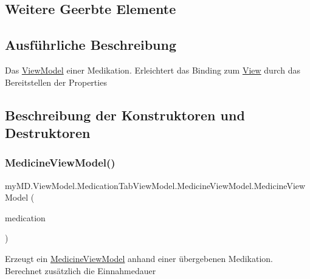 \subsection*{Weitere Geerbte Elemente}


\subsection{Ausführliche Beschreibung}
Das \mbox{\hyperlink{namespacemy_m_d_1_1_view_model}{View\+Model}} einer Medikation. Erleichtert das Binding zum \mbox{\hyperlink{namespacemy_m_d_1_1_view}{View}} durch das Bereitstellen der Properties 



\subsection{Beschreibung der Konstruktoren und Destruktoren}
\mbox{\label{classmy_m_d_1_1_view_model_1_1_medication_tab_view_model_1_1_medicine_view_model_ae443badf863a9a10f8db6065c7c2268f}} 
\subsubsection{\texorpdfstring{Medicine\+View\+Model()}{MedicineViewModel()}\hspace{0.1cm}{\footnotesize\ttfamily [1/2]}}
{\footnotesize\ttfamily my\+M\+D.\+View\+Model.\+Medication\+Tab\+View\+Model.\+Medicine\+View\+Model.\+Medicine\+View\+Model (\begin{DoxyParamCaption}\item[{\mbox{\hyperlink{interfacemy_m_d_1_1_model_interface_1_1_data_model_interface_1_1_i_medication}{I\+Medication}}}]{medication }\end{DoxyParamCaption})}



Erzeugt ein \mbox{\hyperlink{classmy_m_d_1_1_view_model_1_1_medication_tab_view_model_1_1_medicine_view_model}{Medicine\+View\+Model}} anhand einer übergebenen Medikation. Berechnet zusätzlich die Einnahmedauer 


